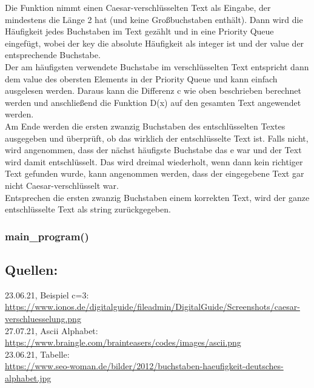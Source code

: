 \documentclass[ngerman,12pt]{article}
\begin{document}
Die Funktion nimmt einen Caesar-verschlüsselten Text als Eingabe, der mindestens die Länge 2 hat (und keine Großbuchstaben enthält). Dann wird die Häufigkeit jedes Buchstaben im Text gezählt und in eine Priority Queue eingefügt, wobei der key die absolute Häufigkeit als integer ist und der value der entsprechende Buchstabe.\\
Der am häufigsten verwendete Buchstabe im verschlüsselten Text entspricht dann dem value des obersten Elements in der Priority Queue und kann einfach ausgelesen werden. Daraus kann die Differenz c wie oben beschrieben berechnet werden und anschließend die Funktion D(x) auf den gesamten Text angewendet werden.\\
Am Ende werden die ersten zwanzig Buchstaben des entschlüsselten Textes ausgegeben und überprüft, ob das wirklich der entschlüsselte Text ist.
Falls nicht, wird angenommen, dass der nächst häufigste Buchstabe das e war und der Text wird damit entschlüsselt. Das wird dreimal wiederholt, wenn dann kein richtiger Text gefunden wurde, kann angenommen werden, dass der eingegebene Text gar nicht Caesar-verschlüsselt war.\\
Entsprechen die ersten zwanzig Buchstaben einem korrekten Text, wird der ganze entschlüsselte Text als string zurückgegeben.


\subsubsection*{main\_program()}


\newpage
\subsection*{Quellen:}

23.06.21, Beispiel c=3: \\
\url{https://www.ionos.de/digitalguide/fileadmin/DigitalGuide/Screenshots/caesar-verschluesselung.png}\\
27.07.21, Ascii Alphabet: \\
\url{https://www.braingle.com/brainteasers/codes/images/ascii.png}\\
23.06.21, Tabelle: \\
\url{https://www.seo-woman.de/bilder/2012/buchstaben-haeufigkeit-deutsches-alphabet.jpg}\\
 
\end{document}
